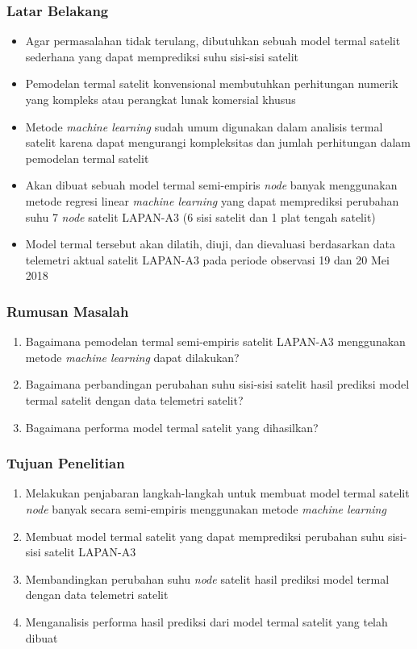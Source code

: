 \documentclass[8pt]{beamer}
\begin{document}
\begin{frame}
  \frametitle{Latar Belakang}
    \begin{itemize}
      \item Agar permasalahan tidak terulang, dibutuhkan sebuah model termal satelit sederhana yang dapat memprediksi suhu sisi-sisi satelit
      \item Pemodelan termal satelit konvensional membutuhkan perhitungan numerik yang kompleks \cite{das} atau perangkat lunak komersial khusus \cite{boudjemai2015}
      \item Metode \textit{machine learning} sudah umum digunakan dalam analisis termal satelit karena dapat mengurangi kompleksitas dan jumlah perhitungan dalam pemodelan termal satelit \cite{junior2017}\cite{escobar2016}\cite{xiong2020}
      \item Akan dibuat sebuah model termal semi-empiris \textit{node} banyak menggunakan metode regresi linear \textit{machine learning} yang dapat memprediksi perubahan suhu 7 \textit{node} satelit LAPAN-A3 (6 sisi satelit dan 1 plat tengah satelit)
      \item Model termal tersebut akan dilatih, diuji, dan dievaluasi berdasarkan data telemetri aktual satelit LAPAN-A3 pada periode observasi 19 dan 20 Mei 2018
    \end{itemize}
\end{frame}

\begin{frame}
  \frametitle{Rumusan Masalah}
  \begin{enumerate}
    \item Bagaimana pemodelan termal semi-empiris satelit LAPAN-A3 menggunakan metode \textit{machine learning} dapat dilakukan?
    \item Bagaimana perbandingan perubahan suhu sisi-sisi satelit hasil prediksi model termal satelit dengan data telemetri satelit?
    \item Bagaimana performa model termal satelit yang dihasilkan?
  \end{enumerate}
\end{frame}

\begin{frame}
  \frametitle{Tujuan Penelitian}
  \begin{enumerate}
    \item Melakukan penjabaran langkah-langkah untuk membuat model termal satelit \textit{node} banyak secara semi-empiris menggunakan metode \textit{machine learning}
    \item Membuat model termal satelit yang dapat memprediksi perubahan suhu sisi-sisi satelit LAPAN-A3
    \item Membandingkan perubahan suhu \textit{node} satelit hasil prediksi model termal dengan data telemetri satelit
    \item Menganalisis performa hasil prediksi dari model termal satelit yang telah dibuat
\end{enumerate}

\end{frame}
\end{document}
